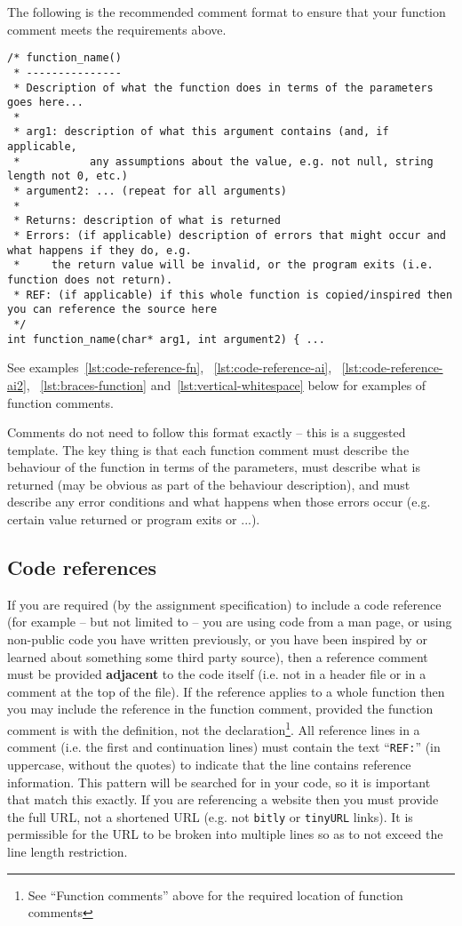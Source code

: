 \documentclass{article}
\begin{document}
The following is the recommended comment format to ensure that your function comment meets the requirements above.

\nolinenumbers
\begin{lstlisting}
/* function_name()
 * ---------------
 * Description of what the function does in terms of the parameters goes here...
 *
 * arg1: description of what this argument contains (and, if applicable, 
 *           any assumptions about the value, e.g. not null, string length not 0, etc.)
 * argument2: ... (repeat for all arguments)
 *
 * Returns: description of what is returned
 * Errors: (if applicable) description of errors that might occur and what happens if they do, e.g.
 *     the return value will be invalid, or the program exits (i.e. function does not return). 
 * REF: (if applicable) if this whole function is copied/inspired then you can reference the source here
 */
int function_name(char* arg1, int argument2) { ...
\end{lstlisting}
\linenumbers

See examples~\ref{lst:code-reference-fn}, ~\ref{lst:code-reference-ai}, ~\ref{lst:code-reference-ai2}, ~\ref{lst:braces-function} and~\ref{lst:vertical-whitespace} below for examples of function 
comments.

Comments do not need to follow this format exactly -- this is a suggested template. The key thing is that each function comment 
must describe the behaviour of the function in terms of the parameters, must describe what is returned (may be obvious as 
part of the behaviour description), and must describe any error conditions and what happens when those errors occur (e.g.
certain value returned or program exits or ...).

\subsection{Code references}
If you are required (by the assignment specification) 
to include a code reference (for example -- but not limited to -- you are using code from a man page, or using non-public code you have 
written previously, or you have been inspired by or learned about something some third party source), then a reference comment must be provided
\textbf{adjacent} to the code itself (i.e. not in a header file or in a comment at the top of the file). If the reference applies to a whole
function then you may include the reference in the function comment, provided the function comment is with the definition, not the declaration\footnote{See ``Function comments'' above for the required location of function comments}. All reference lines 
in a comment (i.e. the first and continuation lines) must contain the text ``\texttt{REF:}'' (in uppercase, 
without the quotes) to indicate that the line contains reference information. This pattern will be searched for in your code, so it is important that match this exactly. If you are referencing a website then you must provide the full URL, not a shortened URL (e.g. not \texttt{bitly} or \texttt{tinyURL} links). 
It is permissible for the URL to be broken into multiple lines so as to not exceed the line length restriction.
\end{document}

